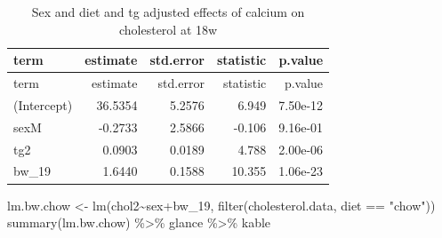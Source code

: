 \documentclass[
]{article}
\newenvironment{Shaded}{\begin{snugshade}}{\end{snugshade}}
\newcommand{\FunctionTok}[1]{\textcolor[rgb]{0.00,0.00,0.00}{#1}}
\newcommand{\NormalTok}[1]{#1}
\newcommand{\OtherTok}[1]{\textcolor[rgb]{0.56,0.35,0.01}{#1}}
\newcommand{\SpecialCharTok}[1]{\textcolor[rgb]{0.00,0.00,0.00}{#1}}
\newcommand{\StringTok}[1]{\textcolor[rgb]{0.31,0.60,0.02}{#1}}
\begin{document}
\begin{longtable}[]{@{}lrrrr@{}}
\caption{Sex and diet and tg adjusted effects of calcium on cholesterol
at 18w}\tabularnewline
\toprule()
term & estimate & std.error & statistic & p.value \\
\midrule()
\endfirsthead
\toprule()
term & estimate & std.error & statistic & p.value \\
\midrule()
\endhead
(Intercept) & 36.5354 & 5.2576 & 6.949 & 7.50e-12 \\
sexM & -0.2733 & 2.5866 & -0.106 & 9.16e-01 \\
tg2 & 0.0903 & 0.0189 & 4.788 & 2.00e-06 \\
bw\_19 & 1.6440 & 0.1588 & 10.355 & 1.06e-23 \\
\bottomrule()
\end{longtable}

\begin{Shaded}
\begin{Highlighting}[]
\NormalTok{lm.bw.chow }\OtherTok{\textless{}{-}} \FunctionTok{lm}\NormalTok{(chol2}\SpecialCharTok{\textasciitilde{}}\NormalTok{sex}\SpecialCharTok{+}\NormalTok{bw\_19, }\FunctionTok{filter}\NormalTok{(cholesterol.data, diet }\SpecialCharTok{==} \StringTok{"chow"}\NormalTok{))}
\FunctionTok{summary}\NormalTok{(lm.bw.chow) }\SpecialCharTok{\%\textgreater{}\%}\NormalTok{ glance }\SpecialCharTok{\%\textgreater{}\%}\NormalTok{ kable}
\end{Highlighting}
\end{Shaded}
\end{document}
